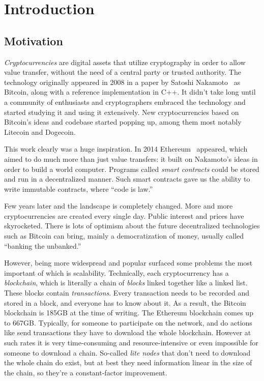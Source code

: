 \chapter{Introduction}

\section{Motivation}
\emph{Cryptocurrencies} are digital assets that utilize cryptography in order to allow value transfer, without the need of a central party or trusted authority. The technology originally appeared in 2008 in a paper by Satoshi Nakamoto~\cite{bitcoin} as Bitcoin, along with a reference implementation in C++. It didn't take long until a community of enthusiasts and cryptographers embraced the technology and started studying it and using it extensively. New cryptocurrencies based on Bitcoin's ideas and codebase started popping up, among them most notably Litecoin and Dogecoin.

This work clearly was a huge inspiration. In 2014 Ethereum~\cite{ethereum,vbuterin} appeared, which aimed to do much more than just value transfers: it built on Nakamoto's ideas in order to build a world computer. Programs called \emph{smart contracts} could be stored and run in a decentralized manner. Such smart contracts gave us the ability to write immutable contracts, where ``code is law.''

Few years later and the landscape is completely changed. More and more cryptocurrencies are created every single day. Public interest and prices have skyrocketed. There is lots of optimism about the future decentralized technologies such as Bitcoin can bring, mainly a democratization of money, usually called ``banking the unbanked.''

However, being more widespread and popular surfaced some problems the most important of which is scalability. Technically, each cryptocurrency has a \emph{blockchain}, which is literally a chain of \emph{blocks} linked together like a linked list. These blocks contain \emph{transactions}. Every transaction needs to be recorded and stored in a block, and everyone has to know about it. As a result, the Bitcoin blockchain is 185GB at the time of writing. The Ethereum blockchain comes up to 667GB. Typically, for someone to participate on the network, and do actions like send transactions they have to download the whole blockchain. However at such rates it is very time-consuming and resource-intensive or even impossible for someone to download a chain. So-called \emph{lite nodes} that don't need to download the whole chain do exist, but at best they need information linear in the size of the chain, so they're a constant-factor improvement.

